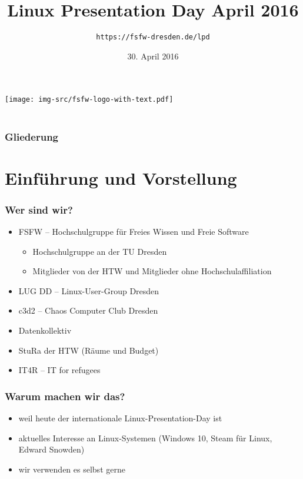\documentclass[t]{beamer}
\title{Linux Presentation Day April 2016}
\author{\texttt{https://fsfw-dresden.de/lpd}}
\date[30.04.2016]{30. April 2016}
\begin{document}
\begin{frame}
  \begin{center}%
\texttt{[image: img-src/fsfw-logo-with-text.pdf]}\\%
\vspace*{-1em}{Freie Software Freies Wissen}\\[1em]
  \end{center}
\end{frame}

\begin{frame}
  \frametitle{Gliederung}
  \tableofcontents
\end{frame}

\section{Einführung und Vorstellung}
\begin{frame}
  \frametitle{Wer sind wir?}
  \begin{itemize}
  \item FSFW – Hochschulgruppe für Freies Wissen und Freie Software
    \begin{itemize}
    \item Hochschulgruppe an der TU Dresden
    \item Mitglieder von der HTW und Mitglieder ohne
      Hochschulaffiliation
    \end{itemize}
  \item LUG DD – Linux-User-Group Dresden
  \item c3d2 – Chaos Computer Club Dresden
  \item Datenkollektiv
  \item StuRa der HTW (Räume und Budget)
  \item IT4R – IT for refugees
  \end{itemize}
\end{frame}

\begin{frame}
  \frametitle{Warum machen wir das?}
  \begin{itemize}
  \item weil heute der internationale Linux-Presentation-Day ist
  \item aktuelles Interesse an Linux-Systemen (Windows 10, Steam
    für Linux, Edward Snowden)
  \item wir verwenden es selbst gerne
  \end{itemize}
\end{frame}
\end{document}
